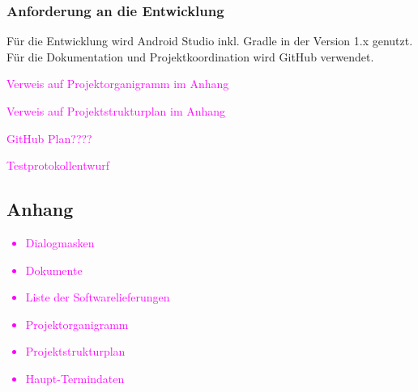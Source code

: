 \subsubsection{\textbf{Anforderung an die Entwicklung}}

Für die Entwicklung wird Android Studio inkl. Gradle in der Version 1.x genutzt. Für die Dokumentation und Projektkoordination wird GitHub verwendet.



\textcolor{magenta}{Verweis auf Projektorganigramm im Anhang}


\textcolor{magenta}{Verweis auf Projektstrukturplan im Anhang}

\textcolor{magenta}{GitHub Plan????}

\textcolor{magenta}{Testprotokollentwurf}



\subsection{Anhang}

\textcolor{magenta}{
\begin{itemize}
	\item Dialogmasken
	\item Dokumente
	\item Liste der Softwarelieferungen
	\item Projektorganigramm
	\item Projektstrukturplan
	\item Haupt-Termindaten
\end{itemize}
}